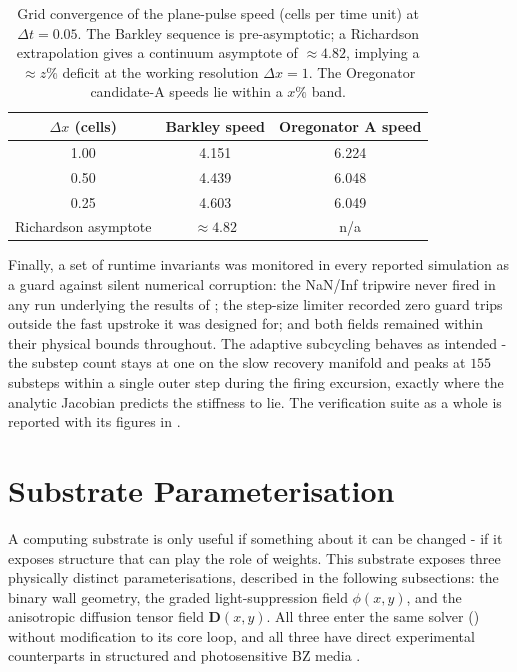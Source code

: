 \begin{table}[htbp]
\centering
\caption{Grid convergence of the plane-pulse speed (cells per time unit) at $\Delta t = 0.05$. The Barkley sequence is pre-asymptotic; a Richardson extrapolation gives a continuum asymptote of $\approx 4.82$, implying a $\approx z\%$ deficit at the working resolution $\Delta x = 1$. The Oregonator candidate-A speeds lie within a $x\%$ band.}
\label{tab:grid_convergence}
\small
\begin{tabular}{@{}ccc@{}}
\toprule
\textbf{$\Delta x$ (cells)} & \textbf{Barkley speed} & \textbf{Oregonator A speed} \\
\midrule
1.00 & 4.151 & 6.224 \\
0.50 & 4.439 & 6.048 \\
0.25 & 4.603 & 6.049 \\
\midrule
Richardson asymptote & $\approx 4.82$ & n/a \\
\bottomrule
\end{tabular}
\end{table}

Finally, a set of runtime invariants was monitored in every reported simulation as a guard against silent numerical corruption: the NaN/Inf tripwire never fired in any run underlying the results of ; the step-size limiter recorded zero guard trips outside the fast upstroke it was designed for; and both fields remained within their physical bounds throughout. 
The adaptive subcycling behaves as intended - the substep count stays at one on the slow recovery manifold and peaks at $155$ substeps within a single outer step during the firing excursion, exactly where the analytic Jacobian predicts the stiffness to lie. 
The verification suite as a whole is reported with its figures in .

\section{Substrate Parameterisation}
\label{sec:meth_parameterisation}

A computing substrate is only useful if something about it can be changed - if it exposes structure that can play the role of weights. 
This substrate exposes three physically distinct parameterisations, described in the following subsections: the binary wall geometry, the graded light-suppression field $\phi(x,y)$, and the anisotropic diffusion tensor field $\mathbf{D}(x,y)$. 
All three enter the same solver () without modification to its core loop, and all three have direct experimental counterparts in structured and photosensitive BZ media \cite{sakurai2002design, steinbock1995anisotropy}.

